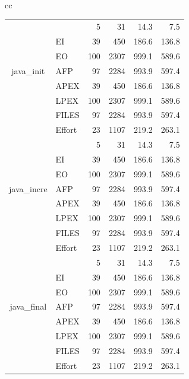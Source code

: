 \documentclass[sigconf,review]{acmart}
\begin{document}
\begin{table}[t!]
{\begin{tabular}{cc}
\begin{tabular}{|c|l|rrrr|}
\multirow{7}{*}{\begin{sideways}java\_init\end{sideways}}
& \IT{LOC} & 5 & 31 & 14.3 & 7.5\\
& EI & 39 & 450 & 186.6 & 136.8\\
& EO & 100 & 2307 & 999.1 & 589.6\\
& AFP & 97 & 2284 & 993.9 & 597.4\\
& APEX & 39 & 450 & 186.6 & 136.8\\
& LPEX & 100 & 2307 & 999.1 & 589.6\\
& FILES & 97 & 2284 & 993.9 & 597.4\\
& Effort & 23 & 1107 & 219.2 & 263.1\\
\hline
\multirow{7}{*}{\begin{sideways}java\_incre\end{sideways}}
& \IT{LOC} & 5 & 31 & 14.3 & 7.5\\
& EI & 39 & 450 & 186.6 & 136.8\\
& EO & 100 & 2307 & 999.1 & 589.6\\
& AFP & 97 & 2284 & 993.9 & 597.4\\
& APEX & 39 & 450 & 186.6 & 136.8\\
& LPEX & 100 & 2307 & 999.1 & 589.6\\
& FILES & 97 & 2284 & 993.9 & 597.4\\
& Effort & 23 & 1107 & 219.2 & 263.1\\
\hline
\multirow{7}{*}{\begin{sideways}java\_final\end{sideways}}
& \IT{LOC} & 5 & 31 & 14.3 & 7.5\\
& EI & 39 & 450 & 186.6 & 136.8\\
& EO & 100 & 2307 & 999.1 & 589.6\\
& AFP & 97 & 2284 & 993.9 & 597.4\\
& APEX & 39 & 450 & 186.6 & 136.8\\
& LPEX & 100 & 2307 & 999.1 & 589.6\\
& FILES & 97 & 2284 & 993.9 & 597.4\\
& Effort & 23 & 1107 & 219.2 & 263.1\\
\hline
\end{tabular} 


~


\end{tabular}}
\end{table}
\end{document}
